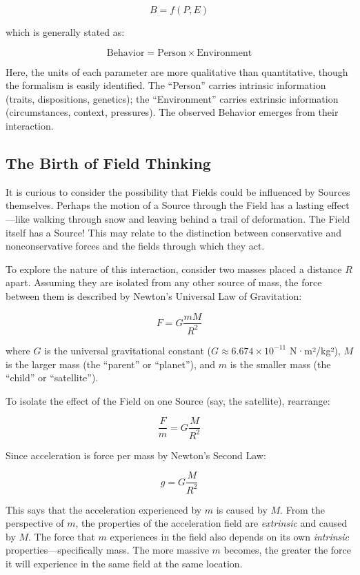 \documentclass[
]{article}
\begin{document}
\[B = f(P, E)\]

which is generally stated as:

\[\text{Behavior} = \text{Person} \times \text{Environment}\]

Here, the units of each parameter are more qualitative than
quantitative, though the formalism is easily identified. The ``Person''
carries intrinsic information (traits, dispositions, genetics); the
``Environment'' carries extrinsic information (circumstances, context,
pressures). The observed Behavior emerges from their interaction.

\subsection{The Birth of Field
Thinking}\label{the-birth-of-field-thinking}

It is curious to consider the possibility that Fields could be
influenced by Sources themselves. Perhaps the motion of a Source through
the Field has a lasting effect---like walking through snow and leaving
behind a trail of deformation. The Field itself has a Source! This may
relate to the distinction between conservative and nonconservative
forces and the fields through which they act.

To explore the nature of this interaction, consider two masses placed a
distance \(R\) apart. Assuming they are isolated from any other source
of mass, the force between them is described by Newton's Universal Law
of Gravitation:

\[F = G\frac{mM}{R^2}\]

where \(G\) is the universal gravitational constant
(\(G \approx 6.674 \times 10^{-11}\) N·m²/kg²), \(M\) is the larger mass
(the ``parent'' or ``planet''), and \(m\) is the smaller mass (the
``child'' or ``satellite'').

To isolate the effect of the Field on one Source (say, the satellite),
rearrange:

\[\frac{F}{m} = G\frac{M}{R^2}\]

Since acceleration is force per mass by Newton's Second Law:

\[g = G\frac{M}{R^2}\]

This says that the acceleration experienced by \(m\) is caused by \(M\).
From the perspective of \(m\), the properties of the acceleration field
are \emph{extrinsic} and caused by \(M\). The force that \(m\)
experiences in the field also depends on its own \emph{intrinsic}
properties---specifically mass. The more massive \(m\) becomes, the
greater the force it will experience in the same field at the same
location.
\end{document}
